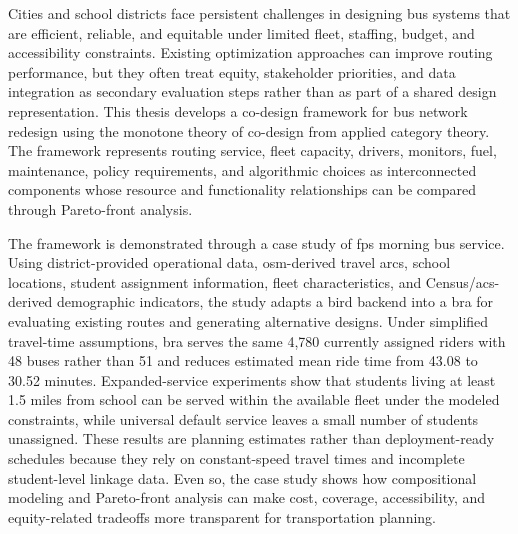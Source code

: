 % 

Cities and school districts face persistent challenges in designing bus systems that are efficient, reliable, and equitable under limited fleet, staffing, budget, and accessibility constraints. Existing optimization approaches can improve routing performance, but they often treat equity, stakeholder priorities, and data integration as secondary evaluation steps rather than as part of a shared design representation. This thesis develops a co-design framework for bus network redesign using the monotone theory of co-design from applied category theory. The framework represents routing service, fleet capacity, drivers, monitors, fuel, maintenance, policy requirements, and algorithmic choices as interconnected components whose resource and functionality relationships can be compared through Pareto-front analysis.

The framework is demonstrated through a case study of \acrlong{fps} morning bus service. Using district-provided operational data, \acrlong{osm}-derived travel arcs, school locations, student assignment information, fleet characteristics, and Census/\acrshort{acs}-derived demographic indicators, the study adapts a \acrlong{bird} backend into a \acrlong{bra} for evaluating existing routes and generating alternative designs. Under simplified travel-time assumptions, \acrshort{bra} serves the same 4,780 currently assigned riders with 48 buses rather than 51 and reduces estimated mean ride time from 43.08 to 30.52 minutes. Expanded-service experiments show that students living at least 1.5 miles from school can be served within the available fleet under the modeled constraints, while universal default service leaves a small number of students unassigned. These results are planning estimates rather than deployment-ready schedules because they rely on constant-speed travel times and incomplete student-level linkage data. Even so, the case study shows how compositional modeling and Pareto-front analysis can make cost, coverage, accessibility, and equity-related tradeoffs more transparent for transportation planning.
